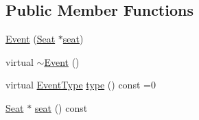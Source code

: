 \subsection*{Public Member Functions}
\begin{DoxyCompactItemize}
\item 
\hyperlink{classmotorcar_1_1Event_aed0a7622e5b4de79eb9c9115993aebbe}{Event} (\hyperlink{classmotorcar_1_1Seat}{Seat} $\ast$\hyperlink{classmotorcar_1_1Event_a7426828c8402193cac63a7b3fda5a17e}{seat})
\item 
virtual \hyperlink{classmotorcar_1_1Event_a3ff67253553db1d656e32a5e660a3ecb}{$\sim$\-Event} ()
\item 
virtual \hyperlink{classmotorcar_1_1Event_af4f5d9ed7dc2d8a2324fa5b0d32c29b0}{Event\-Type} \hyperlink{classmotorcar_1_1Event_a195195c53c024bc76aa0e550ffe438a6}{type} () const =0
\item 
\hyperlink{classmotorcar_1_1Seat}{Seat} $\ast$ \hyperlink{classmotorcar_1_1Event_a7426828c8402193cac63a7b3fda5a17e}{seat} () const 
\end{DoxyCompactItemize}


